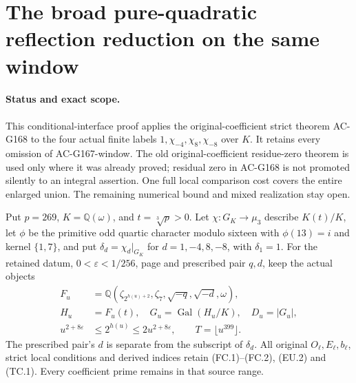 \section{The broad pure-quadratic reflection reduction on the same window}
\label{sec:abelian-reflection-actual-window}

\paragraph{Status and exact scope.}
This conditional-interface proof applies the original-coefficient
strict theorem AC-G168 to the four actual finite labels
$1,\chi_{-4},\chi_8,\chi_{-8}$ over $K$.
It retains every omission of AC-G167-window.
The old original-coefficient residue-zero theorem is used only where
it was already proved; residual zero in AC-G168 is not promoted
silently to an integral assertion.
One full local comparison cost covers the entire enlarged union.
The remaining numerical bound and mixed realization stay open.

Put $p=269$, $K=\mathbb Q(\omega)$, and $t=\sqrt[3]p>0$.
Let $\chi:G_K\to\mu_3$ describe $K(t)/K$, let $\phi$ be the
primitive odd quartic character modulo sixteen with $\phi(13)=i$
and kernel $\{1,7\}$, and put $\delta_d=\chi_d|_{G_K}$ for
$d=1,-4,8,-8$, with $\delta_1=1$.
For the retained datum, $0<\varepsilon<1/256$, page and
prescribed pair $q,d$, keep the actual objects
\[
 \begin{aligned}
 F_u&=\mathbb Q(\zeta_{2^{h(u)+2}},\zeta_7,
                                  \sqrt{-q},\sqrt{-d},\omega),\\
 H_u&=F_u(t),\quad G_u=\operatorname{Gal}(H_u/K),\quad D_u=|G_u|,\\
 u^{2+8\varepsilon}&\leq2^{h(u)}\leq2u^{2+8\varepsilon},
                      \qquad T=\lfloor u^{399}\rfloor .
 \end{aligned}
 \tag{ARW.1}
\]
The prescribed pair's $d$ is separate from the subscript of
$\delta_d$.  All original $O_\ell,E_\ell,b_\ell$, strict local
conditions and derived indices retain (FC.1)--(FC.2), (EU.2)
and (TC.1).  Every coefficient prime remains in that source range.

